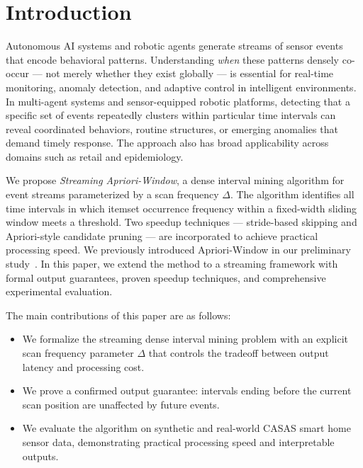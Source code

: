 \section{Introduction}

Autonomous AI systems and robotic agents generate streams of sensor events
that encode behavioral patterns.
Understanding \textit{when} these patterns densely co-occur --- not merely whether
they exist globally --- is essential for real-time monitoring, anomaly detection,
and adaptive control in intelligent environments.
In multi-agent systems and sensor-equipped robotic platforms,
detecting that a specific set of events repeatedly clusters within particular
time intervals can reveal coordinated behaviors, routine structures,
or emerging anomalies that demand timely response.
The approach also has broad applicability across domains such as retail and epidemiology.

We propose \textit{Streaming Apriori-Window}, a dense interval mining
algorithm for event streams parameterized by a scan frequency $\Delta$.
The algorithm identifies all time intervals in which itemset occurrence
frequency within a fixed-width sliding window meets a threshold.
Two speedup techniques --- stride-based skipping and Apriori-style
candidate pruning --- are incorporated to achieve practical processing speed.
We previously introduced Apriori-Window in our preliminary study~\cite{takayasu2025arxiv}.
In this paper, we extend the method to a streaming framework with formal output guarantees,
proven speedup techniques, and comprehensive experimental evaluation.

The main contributions of this paper are as follows:
\begin{itemize}
  \item We formalize the streaming dense interval mining problem with
        an explicit scan frequency parameter $\Delta$ that controls the tradeoff
        between output latency and processing cost.
  \item We prove a confirmed output guarantee: intervals ending before
        the current scan position are unaffected by future events.
  \item We evaluate the algorithm on synthetic and real-world CASAS
        smart home sensor data, demonstrating practical processing speed
        and interpretable outputs.
\end{itemize}
